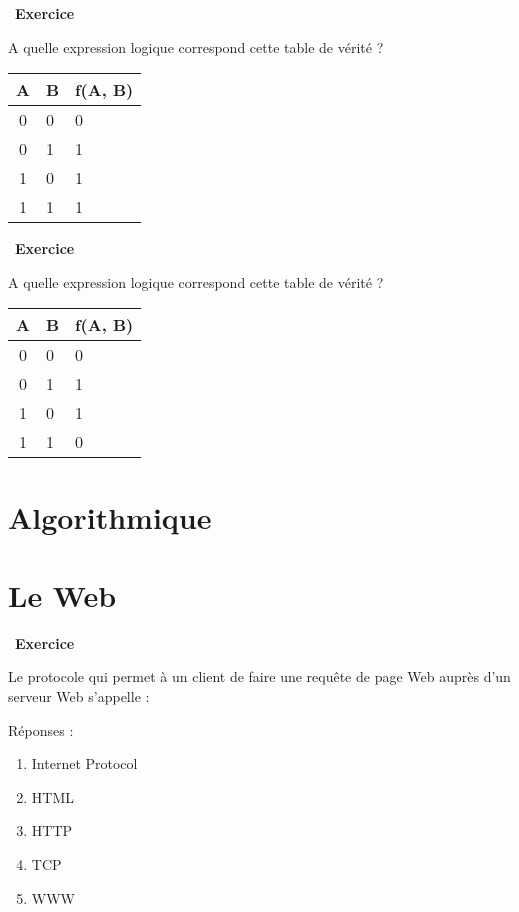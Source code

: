 \documentclass[
  11pt,
]{article}
\providecommand{\tightlist}{%
  \setlength{\itemsep}{0pt}\setlength{\parskip}{0pt}}
\newcounter{exo}
\newenvironment{exercice}[1]
{\par \medskip   \addtocounter{exo}{1} \noindent  
\begin{bclogo}[arrondi =0.1,   noborder = true, logo=\bccrayon, marge=4]{~\textbf{Exercice} \textbf{\theexo} {\itshape #1} }  \par}
{
\end{bclogo}
 \par \bigskip }
\newcounter{def}
\newcounter{alg}
\newcounter{logi}
\begin{document}
\begin{exercice}{}

A quelle expression logique correspond cette table de vérité ?

\begin{longtable}[]{@{}cll@{}}
\toprule
A & B & f(A, B)\tabularnewline
\midrule
\endhead
0 & 0 & 0\tabularnewline
0 & 1 & 1\tabularnewline
1 & 0 & 1\tabularnewline
1 & 1 & 1\tabularnewline
\bottomrule
\end{longtable}

\end{exercice}

\begin{exercice}{}

A quelle expression logique correspond cette table de vérité ?

\begin{longtable}[]{@{}cll@{}}
\toprule
A & B & f(A, B)\tabularnewline
\midrule
\endhead
0 & 0 & 0\tabularnewline
0 & 1 & 1\tabularnewline
1 & 0 & 1\tabularnewline
1 & 1 & 0\tabularnewline
\bottomrule
\end{longtable}

\end{exercice}

\hypertarget{algorithmique}{%
\section{Algorithmique}\label{algorithmique}}

\hypertarget{le-web}{%
\section{Le Web}\label{le-web}}

\begin{exercice}{}

Le protocole qui permet à un client de faire une requête de page Web
auprès d'un serveur Web s'appelle :

Réponses :

\begin{enumerate}
\def\labelenumi{\Alph{enumi})}
\tightlist
\item
  Internet Protocol
\item
  HTML
\item
  HTTP
\item
  TCP
\item
  WWW
\end{enumerate}

\end{exercice}
\end{document}

